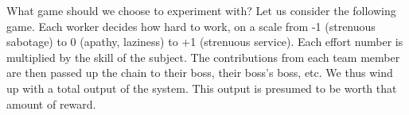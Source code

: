 \documentclass{article}
\begin{document}
What game should we choose to experiment with? Let us consider the
following game. Each worker decides how hard to work, on a scale from
-1 (strenuous sabotage) to 0 (apathy, laziness) to +1 (strenuous
service). Each effort number is multiplied by the skill of the
subject. The contributions from each team member are then passed up
the chain to their boss, their boss's boss, etc. We thus wind up with
a total output of the system. This output is presumed to be worth that
amount of reward.

 

\end{document}
